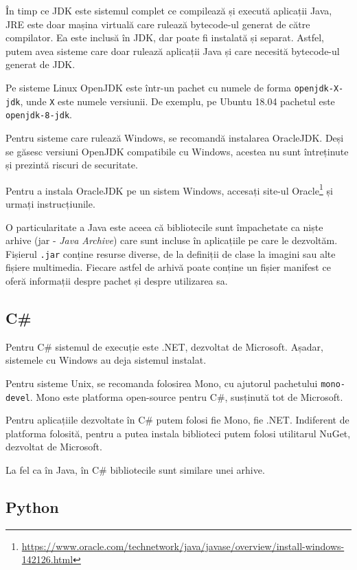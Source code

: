 În timp ce JDK este sistemul complet ce compilează și execută aplicații Java,
JRE este doar mașina virtuală care rulează bytecode-ul generat de către
compilator. Ea este inclusă în JDK, dar poate fi instalată și separat. Astfel,
putem avea sisteme care doar rulează aplicații Java și care necesită bytecode-ul
generat de JDK.

Pe sisteme Linux OpenJDK este într-un pachet cu numele de forma \texttt{openjdk-X-jdk}, unde \texttt{X} este numele versiunii. De exemplu, pe Ubuntu 18.04 pachetul este \texttt{openjdk-8-jdk}.

Pentru sisteme care rulează Windows, se recomandă instalarea OracleJDK. Deși se
găsesc versiuni OpenJDK compatibile cu Windows, acestea nu sunt întreținute și
prezintă riscuri de securitate.

Pentru a instala OracleJDK pe un sistem Windows, accesați site-ul Oracle\footnote{\url{https://www.oracle.com/technetwork/java/javase/overview/install-windows-142126.html}} și
urmați instrucțiunile.

O particularitate a Java este aceea că bibliotecile sunt împachetate ca niște
arhive (jar  - \textit{Java Archive}) care sunt incluse în aplicațiile pe care le
dezvoltăm. Fișierul \texttt{.jar} conține resurse diverse, de la definiții de clase la
imagini sau alte fișiere multimedia. Fiecare astfel de arhivă poate conține un
fișier manifest ce oferă informații despre pachet și despre utilizarea sa.

\subsection{C\#}
\label{sec:appdev:dev-env:csharp}

Pentru C\# sistemul de execuție este .NET, dezvoltat de Microsoft. Așadar,
sistemele cu Windows au deja sistemul instalat.

Pentru sisteme Unix, se recomanda folosirea Mono, cu ajutorul pachetului \texttt{mono-devel}. Mono este platforma
open-source pentru C\#, susținută tot de Microsoft.

Pentru aplicațiile dezvoltate în C\# putem folosi fie Mono, fie .NET. Indiferent
de platforma folosită, pentru a putea instala biblioteci putem folosi utilitarul
NuGet, dezvoltat de Microsoft.

La fel ca în Java, în C\# bibliotecile sunt similare unei arhive.

\subsection{Python}
\label{sec:appdev:dev-env:python}

